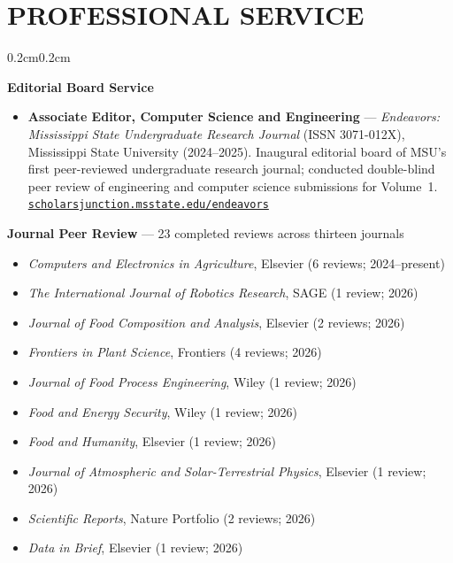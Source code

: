 \documentclass[10pt, letterpaper]{article}
\newenvironment{highlights}{%
    \begin{itemize}[topsep=0.08cm, parsep=0.08cm, partopsep=0pt,
                    itemsep=0pt, leftmargin=0.4cm + 10pt]
}{\end{itemize}}
\newenvironment{onecolentry}{%
    \begin{adjustwidth}{0.2cm}{0.2cm}
}{\end{adjustwidth}}
\begin{document}
\section{PROFESSIONAL SERVICE}
\vspace{0.08cm}
\begin{onecolentry}
    \textbf{Editorial Board Service}
    \begin{highlights}
        \item \textbf{Associate Editor, Computer Science and Engineering} ---
              \emph{Endeavors: Mississippi State Undergraduate Research Journal}
              (ISSN 3071-012X), Mississippi State University (2024--2025).
              Inaugural editorial board of MSU's first peer-reviewed undergraduate
              research journal; conducted double-blind peer review of engineering
              and computer science submissions for Volume~1.
              \\ \href{https://scholarsjunction.msstate.edu/endeavors/}{\texttt{scholarsjunction.msstate.edu/endeavors}}
    \end{highlights}
    \vspace{0.10cm}
    \textbf{Journal Peer Review} --- 23 completed reviews across thirteen journals
    \begin{highlights}
        \item \emph{Computers and Electronics in Agriculture}, Elsevier
              (6 reviews; 2024--present)
        \item \emph{The International Journal of Robotics Research}, SAGE
              (1 review; 2026)
        \item \emph{Journal of Food Composition and Analysis}, Elsevier (2 reviews; 2026)
        \item \emph{Frontiers in Plant Science}, Frontiers (4 reviews; 2026)
        \item \emph{Journal of Food Process Engineering}, Wiley (1 review; 2026)
        \item \emph{Food and Energy Security}, Wiley (1 review; 2026)
        \item \emph{Food and Humanity}, Elsevier (1 review; 2026)
        \item \emph{Journal of Atmospheric and Solar-Terrestrial Physics}, Elsevier
              (1 review; 2026)
        \item \emph{Scientific Reports}, Nature Portfolio (2 reviews; 2026)
        \item \emph{Data in Brief}, Elsevier (1 review; 2026)

\end{highlights}
\end{onecolentry}
\end{document}
